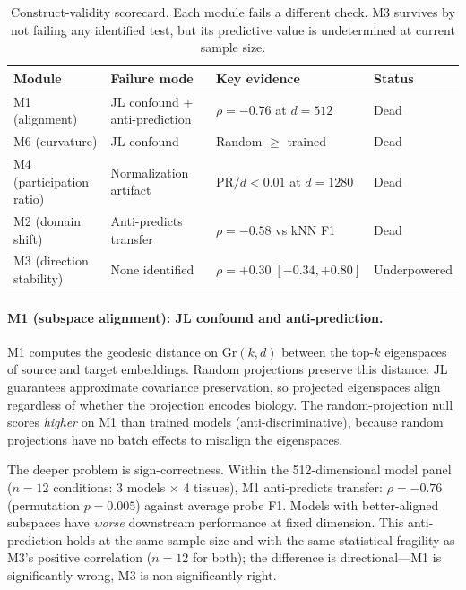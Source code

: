 \documentclass[9pt,lineno]{elife}
\newcommand{\Gr}{\mathrm{Gr}}
\begin{document}
\begin{table}[t]
\centering
\caption{Construct-validity scorecard. Each module fails a different check. M3 survives by not failing any identified test, but its predictive value is undetermined at current sample size.}
\label{tab:scorecard}
\small
\begin{tabular}{@{}llll@{}}
\toprule
Module & Failure mode & Key evidence & Status \\
\midrule
M1 (alignment) & JL confound + anti-prediction & $\rho = -0.76$ at $d = 512$ & Dead \\
M6 (curvature) & JL confound & Random $\geq$ trained & Dead \\
M4 (participation ratio) & Normalization artifact & PR$/d < 0.01$ at $d = 1280$ & Dead \\
M2 (domain shift) & Anti-predicts transfer & $\rho = -0.58$ vs kNN F1 & Dead \\
M3 (direction stability) & None identified & $\rho = +0.30\; [-0.34, +0.80]$ & Underpowered \\
\bottomrule
\end{tabular}
\end{table}

\paragraph{M1 (subspace alignment): JL confound and anti-prediction.}

M1 computes the geodesic distance on $\Gr(k, d)$ between the top-$k$ eigenspaces of source and target embeddings. Random projections preserve this distance: JL guarantees approximate covariance preservation, so projected eigenspaces align regardless of whether the projection encodes biology. The random-projection null scores \emph{higher} on M1 than trained models (anti-discriminative), because random projections have no batch effects to misalign the eigenspaces.

The deeper problem is sign-correctness. Within the 512-dimensional model panel ($n = 12$ conditions: 3 models $\times$ 4 tissues), M1 anti-predicts transfer: $\rho = -0.76$ (permutation $p = 0.005$) against average probe F1. Models with better-aligned subspaces have \emph{worse} downstream performance at fixed dimension. This anti-prediction holds at the same sample size and with the same statistical fragility as M3's positive correlation ($n = 12$ for both); the difference is directional---M1 is significantly wrong, M3 is non-significantly right.
\end{document}
